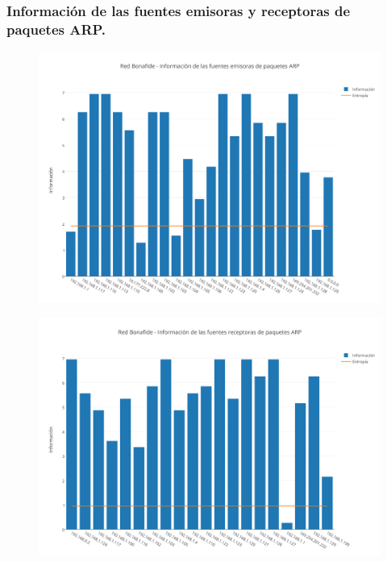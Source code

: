 \subsubsection{Informaci\'on de las fuentes emisoras y receptoras de paquetes ARP.}

\begin{figure}[h!]
    \centering                                                       
    \includegraphics[width=400pt]{img/RedBonafideFuentesEmisorasARP}
    \caption{}
    \label{bonafideEmisoras}
\end{figure}

\begin{figure}[h!]
    \centering                                                       
    \includegraphics[width=400pt]{img/RedBonafideFuentesReceptorasARP}
    \caption{}
    \label{bonafideReceptoras}
\end{figure}




